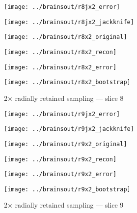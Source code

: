 \documentclass[review,supplement,onefignum,onetabnum,juq]{siamonline181217}
\begin{document}
\begin{figure}
\begin{centering}

\parbox{\imsize}{\texttt{[image: ../brainsout/r8jx2\_error]}}
\parbox{\imsize}{\texttt{[image: ../brainsout/r8jx2\_jackknife]}}

\vspace{\vertsep}

\parbox{\imsize}{\texttt{[image: ../brainsout/r8x2\_original]}}
\parbox{\imsize}{\texttt{[image: ../brainsout/r8x2\_recon]}}

\vspace{\vertsep}

\parbox{\imsize}{\texttt{[image: ../brainsout/r8x2\_error]}}
\parbox{\imsize}{\texttt{[image: ../brainsout/r8x2\_bootstrap]}}

\end{centering}
\caption{2$\times$ radially retained sampling --- slice 8}
\end{figure}


\begin{figure}
\begin{centering}

\parbox{\imsize}{\texttt{[image: ../brainsout/r9jx2\_error]}}
\parbox{\imsize}{\texttt{[image: ../brainsout/r9jx2\_jackknife]}}

\vspace{\vertsep}

\parbox{\imsize}{\texttt{[image: ../brainsout/r9x2\_original]}}
\parbox{\imsize}{\texttt{[image: ../brainsout/r9x2\_recon]}}

\vspace{\vertsep}

\parbox{\imsize}{\texttt{[image: ../brainsout/r9x2\_error]}}
\parbox{\imsize}{\texttt{[image: ../brainsout/r9x2\_bootstrap]}}

\end{centering}
\caption{2$\times$ radially retained sampling --- slice 9}
\end{figure}
\end{document}
